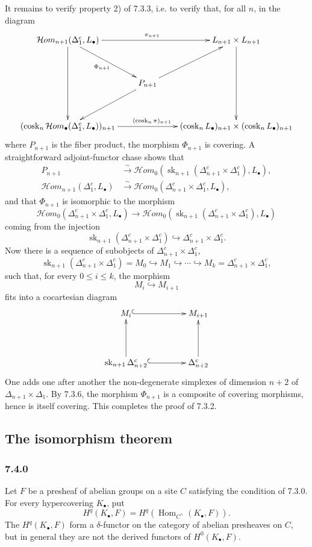 \documentclass[11pt]{article}
\newcommand{\Hom}{\operatorname{Hom}}
\newcommand{\Hhom}{\mathcal{H}om}
\newcommand{\sk}{\operatorname{sk}}
\newcommand{\cosk}{\operatorname{cosk}}
\begin{document}
It remains to verify property 2) of 7.3.3, i.e. to verify that, for all $n$, in the diagram
\[
\xymatrix@C=.75cm@R=1.25cm{
\Hhom_{n+1}(\Delta_1^c,L_\bullet)\ar[rr]^{\pi_{n+1}}\ar[dd]\ar[rd]_{\Phi_{n+1}}&&L_{n+1}\times L_{n+1}\ar[dd]\\
&P_{n+1}\ar[ru]\ar[ld]&\\
(\cosk_n\Hhom_\bullet(\Delta_1^c,L_\bullet))_{n+1}\ar[rr]^{(\cosk_n\pi)_{n+1}}&&
(\cosk_nL_\bullet)_{n+1}\times(\cosk_nL_\bullet)_{n+1}
}
\]
where $P_{n+1}$ is the fiber product, the morphism $\Phi_{n+1}$ is covering. A straightforward adjoint-functor chase shows that
\begin{align*}
P_{n+1}&\xrightarrow{\sim}\Hhom_0(\sk_{n+1}(\Delta_{n+1}^c\times\Delta_1^c),L_\bullet),\\
\Hhom_{n+1}(\Delta_1^c,L_\bullet)&\xrightarrow{\sim}\Hhom_0(\Delta_{n+1}^c\times\Delta_1^c,L_\bullet),
\end{align*}
and that $\Phi_{n+1}$ is isomorphic to the morphism
\[
\Hhom_0(\Delta_{n+1}^c\times\Delta_1^c,L_\bullet)
\to
\Hhom_0(\sk_{n+1}(\Delta_{n+1}^c\times\Delta_1^c),L_\bullet)
\]
coming from the injection
\[
        \sk_{n+1}(\Delta_{n+1}^c\times\Delta_1^c)\hookrightarrow \Delta_{n+1}^c\times\Delta_1^c.
\]
Now there is a sequence of subobjects of $\Delta_{n+1}^c\times\Delta_1^c$,
\[
\sk_{n+1}(\Delta_{n+1}^c\times\Delta_1^c)=M_0\hookrightarrow M_1\hookrightarrow\cdots\hookrightarrow M_k=\Delta_{n+1}^c\times\Delta_1^c,
\]
such that, for every $0\leq i\leq k$, the morphism
\[
        M_i\hookrightarrow M_{i+1}
\]
fits into a cocartesian diagram
\[
\xymatrix@C=1.5cm@R=1.5cm{
M_i\ar@{^{(}->}[r]&M_{i+1}\\
\sk_{n+1}\Delta_{n+2}^c\ar@{^{(}->}[r]\ar[u]&\Delta_{n+2}^c\ar[u].
}
\]
One adds one after another the non-degenerate simplexes of dimension $n+2$ of $\Delta_{n+1}\times\Delta_1$. By 7.3.6, the morphism $\Phi_{n+1}$ is a composite of covering morphisms, hence is itself covering. This completes the proof of 7.3.2.

\subsection{The isomorphism theorem}

\subsubsection*{7.4.0}
Let $F$ be a presheaf of abelian groups on a site $C$ satisfying the condition of 7.3.0. For every hypercovering $K_\bullet$, put
\[
        H^q(K_\bullet,F)=H^q(\Hom_{C^{\wedge}}(K_\bullet,F)).
\]
The $H^q(K_\bullet,F)$ form a $\delta$-functor on the category of abelian presheaves on $C$, but in general they are not the derived functors of $H^0(K_\bullet,F)$.
\end{document}
